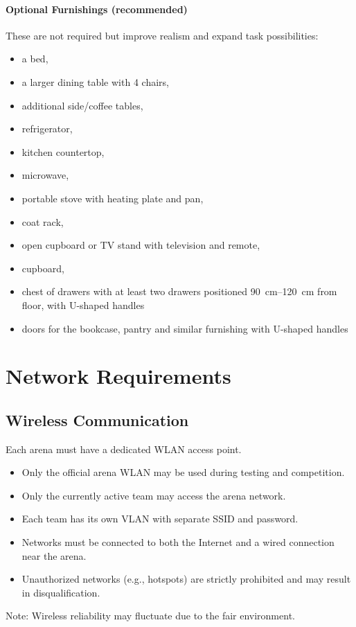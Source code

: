 \paragraph{Optional Furnishings (recommended)}
These are not required but improve realism and expand task possibilities:
\begin{itemize}
    \item a bed,
    \item a larger dining table with 4 chairs,
    \item additional side/coffee tables,
    \item refrigerator,
    \item kitchen countertop,
    \item microwave,
    \item portable stove with heating plate and pan,
    \item coat rack,
    \item open cupboard or TV stand with television and remote,
    \item cupboard,
    \item chest of drawers with at least two drawers positioned \qtyrange{90}{120}{\centi\metre} from floor, with U-shaped handles
    \item doors for the bookcase, pantry and similar furnishing with U-shaped handles
\end{itemize}

\section{Network Requirements}

\subsection{Wireless Communication}
Each arena must have a dedicated WLAN access point.
\begin{itemize}
    \item Only the official arena WLAN may be used during testing and competition.
    \item Only the currently active team may access the arena network.
    \item Each team has its own VLAN with separate SSID and password.
    \item Networks must be connected to both the Internet and a wired connection near the arena.
    \item Unauthorized networks (e.g., hotspots) are strictly prohibited and may result in disqualification.
\end{itemize}
Note: Wireless reliability may fluctuate due to the fair environment.

